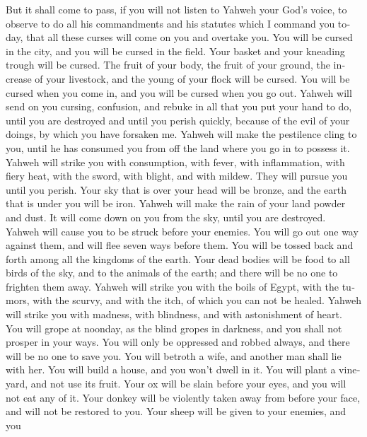 \begin{paracol}{2}
\begin{otherlanguage}{english}
 But it shall come to pass, if you will not listen to
Yahweh your God's voice, to observe to do all his commandments and his
statutes which I command you today, that all these curses will come on
you and overtake you.  You will be cursed in the city,
and you will be cursed in the field.  Your basket and
your kneading trough will be cursed.  The fruit of your
body, the fruit of your ground, the increase of your livestock, and the
young of your flock will be cursed.  You will be cursed
when you come in, and you will be cursed when you go out.
 Yahweh will send on you cursing, confusion, and rebuke
in all that you put your hand to do, until you are destroyed and until
you perish quickly, because of the evil of your doings, by which you
have forsaken me.  Yahweh will make the pestilence cling
to you, until he has consumed you from off the land where you go in to
possess it.  Yahweh will strike you with consumption,
with fever, with inflammation, with fiery heat, with the sword, with
blight, and with mildew. They will pursue you until you perish.
 Your sky that is over your head will be bronze, and the
earth that is under you will be iron.  Yahweh will make
the rain of your land powder and dust. It will come down on you from the
sky, until you are destroyed.  Yahweh will cause you to
be struck before your enemies. You will go out one way against them, and
will flee seven ways before them. You will be tossed back and forth
among all the kingdoms of the earth.  Your dead bodies
will be food to all birds of the sky, and to the animals of the earth;
and there will be no one to frighten them away.  Yahweh
will strike you with the boils of Egypt, with the tumors, with the
scurvy, and with the itch, of which you can not be healed.
 Yahweh will strike you with madness, with blindness, and
with astonishment of heart.  You will grope at noonday,
as the blind gropes in darkness, and you shall not prosper in your ways.
You will only be oppressed and robbed always, and there will be no one
to save you.  You will betroth a wife, and another man
shall lie with her. You will build a house, and you won't dwell in it.
You will plant a vineyard, and not use its fruit.  Your
ox will be slain before your eyes, and you will not eat any of it. Your
donkey will be violently taken away from before your face, and will not
be restored to you. Your sheep will be given to your enemies, and you

\end{otherlanguage}
\end{paracol}
